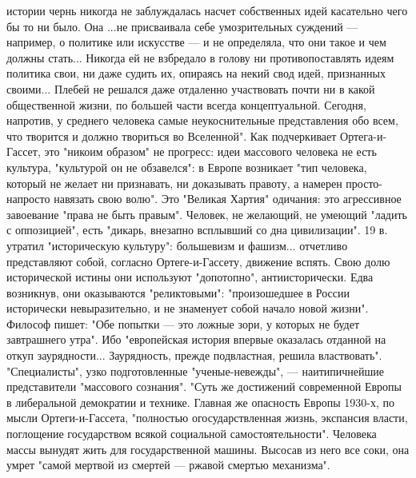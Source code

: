 \documentclass[12pt]{article}
\begin{document}
истории чернь никогда не заблуждалась насчет собственных идей касательно чего бы то ни было. Она ...не
присваивала себе умозрительных суждений — например, о политике или искусстве — и не определяла, что они
такое и чем должны стать... Никогда ей не взбредало в голову ни противопоставлять идеям политика свои, ни
даже  судить  их,  опираясь  на  некий  свод  идей,  признанных  своими...  Плебей  не  решался  даже  отдаленно
участвовать  почти  ни  в  какой  общественной  жизни,  по  большей  части  всегда  концептуальной.  Сегодня,
напротив,  у  среднего  человека  самые  неукоснительные  представления  обо  всем,  что  творится  и  должно
твориться во Вселенной". Как подчеркивает Ортега-и-Гассет, это "никоим образом" не прогресс: идеи массового
человека не есть культура, "культурой он не обзавелся": в Европе возникает "тип человека, который не желает
ни признавать, ни доказывать правоту, а намерен просто-напросто навязать свою волю". Это "Великая Хартия"
одичания: это агрессивное завоевание "права не быть правым". Человек, не желающий, не умеющий "ладить с
оппозицией", есть "дикарь, внезапно всплывший со дна цивилизации". 19 в. утратил "историческую культуру":
большевизм и фашизм... отчетливо представляют собой, согласно Ортеге-и-Гассету, движение вспять. Свою
долю исторической истины они используют "допотопно", антиисторически. Едва возникнув, они оказываются
"реликтовыми": "произошедшее в России исторически невыразительно, и не знаменует собой начало новой
жизни". Философ пишет: "Обе попытки — это ложные зори, у которых не будет завтрашнего утра". Ибо
"европейская история впервые оказалась отданной на откуп заурядности... Заурядность, прежде подвластная,
решила  властвовать".  "Специалисты",  узко  подготовленные  "ученые-невежды",  —  наитипичнейшие
представители "массового сознания". "Суть же достижений современной Европы в либеральной демократии и
технике. Главная же опасность Европы 1930-х, по мысли Ортеги-и-Гассета, "полностью огосударствленная
жизнь, экспансия власти, поглощение государством всякой социальной самостоятельности". Человека массы
вынудят жить для государственной машины. Высосав из него все соки, она умрет "самой мертвой из смертей —
ржавой смертью механизма".
\end{document}
